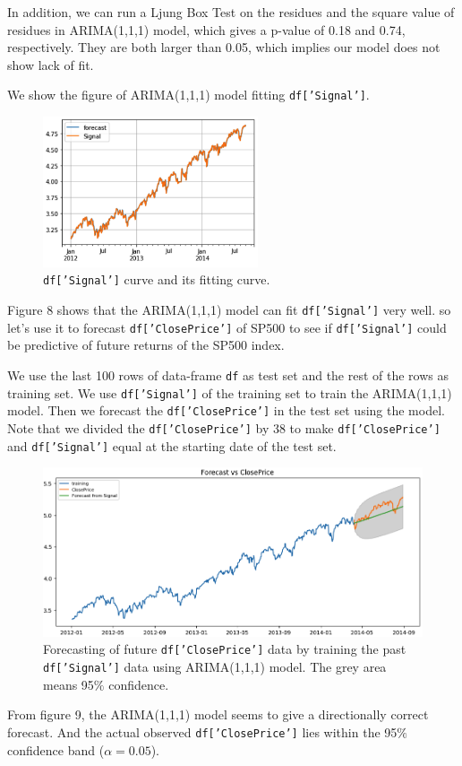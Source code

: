 \documentclass[11pt, oneside]{article}   	%
\begin{document}
In addition, we can run a Ljung Box Test on the residues and  the square value of residues in ARIMA(1,1,1) model, which gives a p-value of 0.18 and 0.74, respectively. They are both larger than 0.05, which implies our model does not show lack of fit.

We show the  figure of  ARIMA(1,1,1) model fitting \texttt{df['Signal']}.
\begin{figure}[htbp]
   \centering
   \includegraphics[width = 2.5in]{fitt.png} 
       \caption{\texttt{df['Signal']} curve and its fitting curve.}
\end{figure}
Figure 8  shows that the ARIMA(1,1,1) model can fit \texttt{df['Signal']} very well. so let's use it to forecast \texttt{df['ClosePrice']} of SP500 to see if \texttt{df['Signal']} could be predictive of future returns of the SP500 index.

We use the last 100 rows of data-frame \texttt{df} as test set and the rest of the rows as training set. We use \texttt{df['Signal']} of the training set to train the ARIMA(1,1,1) model. Then we  forecast the \texttt{df['ClosePrice']} in the test set using the model. Note that we divided the \texttt{df['ClosePrice']} by 38 to make \texttt{df['ClosePrice']} and \texttt{df['Signal']} equal at the starting date of the test set.
\begin{figure}[htbp]
   \centering
   \includegraphics[width = 5in]{fc.png} 
       \caption{Forecasting of future \texttt{df['ClosePrice']} data by training the past \texttt{df['Signal']} data using ARIMA(1,1,1) model. The grey area means 95$\%$ confidence. }
\end{figure}
From figure 9, the ARIMA(1,1,1) model seems to give a directionally correct forecast. And the actual observed \texttt{df['ClosePrice']} lies within the 95$\%$ confidence band ($\alpha=0.05$).
\end{document}
